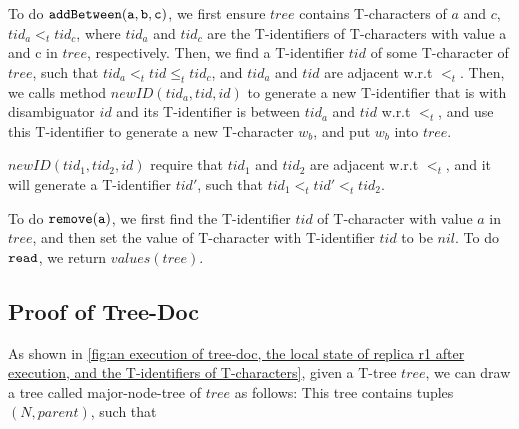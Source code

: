 To do $\alabelshort[{\tt addBetween}]{a,b,c}$, we first ensure $tree$ contains T-characters of $a$ and $c$, $tid_a <_t tid_c$, where $tid_a$ and $tid_c$ are the T-identifiers of T-characters with value a and c in $tree$, respectively. Then, we find a T-identifier $tid$ of some T-character of $tree$, such that $tid_a <_t tid \leq_t tid_c$, and $tid_a$ and $tid$ are adjacent w.r.t $<_t$. Then, we calls method $newID(tid_a,tid,id)$ to generate a new T-identifier that is with disambiguator $id$ and its T-identifier is between $tid_a$ and $tid$ w.r.t $<_t$, and use this T-identifier to generate a new T-character $w_b$, and put $w_b$ into $tree$.

$newID(tid_1,tid_2,id)$ require that $tid_1$ and $tid_2$ are adjacent w.r.t $<_t$, and it will generate a T-identifier $tid'$, such that $tid_1 <_t tid' <_t tid_2$.

To do $\alabelshort[{\tt remove}]{a}$, we first find the T-identifier $tid$ of T-character with value $a$ in $tree$, and then set the value of T-character with T-identifier $tid$ to be $nil$. To do ${\tt read}$, we return $values(tree)$.




\subsection{Proof of Tree-Doc}
\label{subsec:proof of tree-doc}

As shown in \autoref{fig:an execution of tree-doc, the local state of replica r1 after execution, and the T-identifiers of T-characters}, given a T-tree $tree$, we can draw a tree called major-node-tree of $tree$ as follows: This tree contains tuples $(N,parent)$, such that

